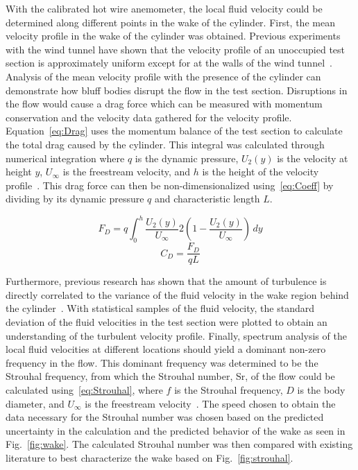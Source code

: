 \documentclass[journal,letterpaper]{IEEEtran}
\begin{document}
With the calibrated hot wire anemometer, the local fluid velocity could be determined along different points in the wake of the cylinder.
First, the mean velocity profile in the wake of the cylinder was obtained.
Previous experiments with the wind tunnel have shown that the velocity profile of an unoccupied test section is approximately uniform except for at the walls of the wind tunnel~\cite{Lab1}.
Analysis of the mean velocity profile with the presence of the cylinder can demonstrate how bluff bodies disrupt the flow in the test section.
Disruptions in the flow would cause a drag force which can be measured with momentum conservation and the velocity data gathered for the velocity profile.
Equation~\eqref{eq:Drag} uses the momentum balance of the test section to calculate the total drag caused by the cylinder.
This integral was calculated through numerical integration where $q$ is the dynamic pressure, $U_2 (y)$ is the velocity at height $y$, $U_\infty$ is the freestream velocity, and $h$ is the height of the velocity profile~\cite{DragData}.
This drag force can then be non-dimensionalized using~\eqref{eq:Coeff} by dividing by its dynamic pressure $q$ and characteristic length $L$.

\begin{equation} \label{eq:Drag}
    F_D = q\int_{0}^{h} \frac{U_2 (y)}{U_\infty}2 \left(1 - \frac{U_2 (y)}{U_\infty}\right)\,dy
\end{equation}
\begin{equation} \label{eq:Coeff}
    C_D = \frac{F_D}{qL}
\end{equation}

Furthermore, previous research has shown that the amount of turbulence is directly correlated to the variance of the fluid velocity in the wake region behind the cylinder~\cite{Strouhal}.
With statistical samples of the fluid velocity, the standard deviation of the fluid velocities in the test section were plotted to obtain an understanding of the turbulent velocity profile.
Finally, spectrum analysis of the local fluid velocities at different locations should yield a dominant non-zero frequency in the flow.
This dominant frequency was determined to be the Strouhal frequency, from which the Strouhal number, Sr, of the flow could be calculated using~\eqref{eq:Strouhal}, where $f$ is the Strouhal frequency, $D$ is the body diameter, and $U_\infty$ is the freestream velocity~\cite{Strouhal}.
The speed chosen to obtain the data necessary for the Strouhal number was chosen based on the predicted uncertainty in the calculation and the predicted behavior of the wake as seen in Fig.~\ref{fig:wake}.
The calculated Strouhal number was then compared with existing literature to best characterize the wake based on Fig.~\ref{fig:strouhal}. 
\end{document}
